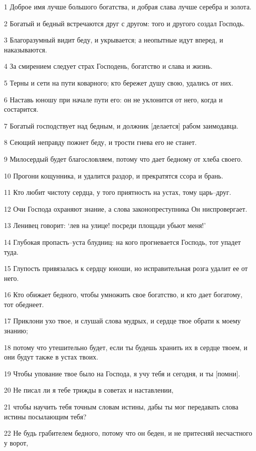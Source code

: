 \par 1 Доброе имя лучше большого богатства, и добрая слава лучше серебра и золота.
\par 2 Богатый и бедный встречаются друг с другом: того и другого создал Господь.
\par 3 Благоразумный видит беду, и укрывается; а неопытные идут вперед, и наказываются.
\par 4 За смирением следует страх Господень, богатство и слава и жизнь.
\par 5 Терны и сети на пути коварного; кто бережет душу свою, удались от них.
\par 6 Наставь юношу при начале пути его: он не уклонится от него, когда и состарится.
\par 7 Богатый господствует над бедным, и должник [делается] рабом заимодавца.
\par 8 Сеющий неправду пожнет беду, и трости гнева его не станет.
\par 9 Милосердый будет благословляем, потому что дает бедному от хлеба своего.
\par 10 Прогони кощунника, и удалится раздор, и прекратятся ссора и брань.
\par 11 Кто любит чистоту сердца, у того приятность на устах, тому царь--друг.
\par 12 Очи Господа охраняют знание, а слова законопреступника Он ниспровергает.
\par 13 Ленивец говорит: `лев на улице! посреди площади убьют меня!'
\par 14 Глубокая пропасть--уста блудниц: на кого прогневается Господь, тот упадет туда.
\par 15 Глупость привязалась к сердцу юноши, но исправительная розга удалит ее от него.
\par 16 Кто обижает бедного, чтобы умножить свое богатство, и кто дает богатому, тот обеднеет.
\par 17 Приклони ухо твое, и слушай слова мудрых, и сердце твое обрати к моему знанию;
\par 18 потому что утешительно будет, если ты будешь хранить их в сердце твоем, и они будут также в устах твоих.
\par 19 Чтобы упование твое было на Господа, я учу тебя и сегодня, и ты [помни].
\par 20 Не писал ли я тебе трижды в советах и наставлении,
\par 21 чтобы научить тебя точным словам истины, дабы ты мог передавать слова истины посылающим тебя?
\par 22 Не будь грабителем бедного, потому что он беден, и не притесняй несчастного у ворот,
